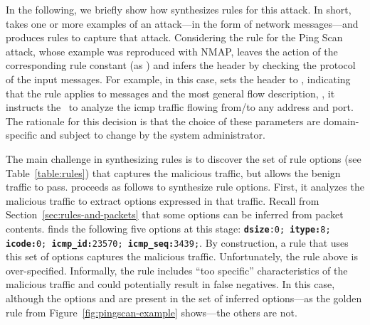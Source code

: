 \documentclass[conference]{IEEEtran}
\begin{document}
In the following, we briefly show how \tname{} synthesizes rules for
this attack. In short, \tname{} takes one or more examples of an
attack---in the form of network messages---and produces rules to
capture that attack. Considering the rule for the Ping Scan attack,
whose example was reproduced with NMAP, \tname{} leaves the action of
the corresponding rule constant (as ) and infers the
header by checking the protocol of the input messages. For example, in
this case, \tname{} sets the header to , indicating that the rule applies to  messages and
the most general flow description, \ie{}, it instructs the \nids\ to
analyze the icmp traffic flowing from/to any address and port.  The
rationale for this decision is that the choice of these parameters are
domain-specific and subject to change by the system administrator.

The main challenge in synthesizing rules is to discover the set of
rule options (see Table~\ref{table:rules}) that captures the malicious
traffic, but allows the benign traffic to pass. \tname{} proceeds as
follows to synthesize rule options. First, it analyzes the malicious
traffic to extract options expressed in that traffic. Recall from
Section~\ref{sec:rules-and-packets} that some options can be inferred
from packet contents. \tname{} finds the following five options at
this stage: {\scriptsize{\texttt{\textbf{dsize}:0; \textbf{itype:}8;
      \textbf{icode:}0; \textbf{icmp\_id:}23570;
      \textbf{icmp\_seq:}3439;}}}.  By construction, a rule that uses
this set of options captures the malicious traffic. Unfortunately, the
rule above is over-specified. Informally, the rule includes ``too
specific'' characteristics of the malicious traffic and could
potentially result in false negatives. In this case, although the
options  and  are present in the set
of inferred options---as the golden rule from
Figure~\ref{fig:pingscan-example} shows---the others are not.

\end{document}
